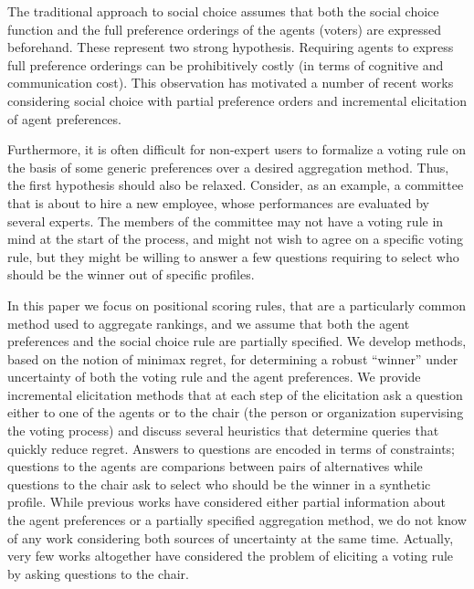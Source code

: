 \documentclass{article}
\begin{document}
The traditional approach to social choice assumes that both the social choice function and the full preference orderings of the agents (voters) are expressed beforehand. These represent two strong hypothesis.
Requiring agents to express full preference orderings can be prohibitively costly (in terms of cognitive and communication cost).
This observation has motivated a number of recent works considering social choice with partial preference orders and incremental elicitation of agent preferences. 

Furthermore, it is often difficult for non-expert users to formalize a voting rule on the basis of some generic preferences over a desired aggregation method. Thus, the first hypothesis should also be relaxed. 
Consider, as an example, a committee that is about to hire a new employee, whose performances are evaluated by several experts. The members of the committee may not have a voting rule in mind at the start of the process, and might not wish to agree on a specific voting rule, but they might be willing to answer a few questions requiring to select who should be the winner out of specific profiles. 

In this paper we focus on positional scoring rules, that are a particularly common method used to aggregate rankings, and we assume that both the agent preferences and the social choice rule are partially specified. 
We develop methods, based on the notion of minimax regret, for determining a robust ``winner'' under uncertainty of both the voting rule and the agent preferences.
We provide incremental elicitation methods that 
at each step of the elicitation ask a question either to one of the agents or to the chair (the person or organization supervising the voting process) and discuss several heuristics that determine queries that quickly reduce regret. 
Answers to questions are encoded in terms of constraints; questions to the agents are comparions between pairs of alternatives while
questions to the chair ask  to select who should be the winner in a synthetic profile.
While previous works have considered either partial information about the agent preferences or a partially specified aggregation method, we do not know of any work considering both sources of uncertainty at the same time.
Actually, very few works altogether have considered the problem of eliciting a voting rule by asking questions to the chair.
\end{document}

